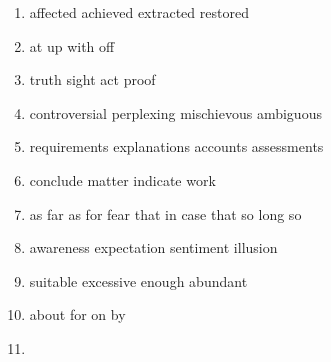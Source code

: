 \newpage
\begin{enumerate}
	\item


\fourchoices
{affected}
{achieved}
{extracted}
{restored}




\item


\fourchoices
{at}
{up}
{with}
{off}




\item


\fourchoices
{truth}
{sight}
{act}
{proof}




\item

\fourchoices
{controversial}
{perplexing}
{mischievous}
{ambiguous}


\item

\fourchoices
{requirements}
{explanations}
{accounts}
{assessments}



\item


\fourchoices
{conclude}
{matter}
{indicate}
{work}




\item

\fourchoices
{as far as}
{for fear that}
{in case that}
{so long so}



\item

\fourchoices
{awareness}
{expectation}
{sentiment}
{illusion}


\item


\fourchoices
{suitable}
{excessive}
{enough}
{abundant}




\item


\fourchoices
{about}
{for}
{on}
{by}




\item



\end{enumerate}
